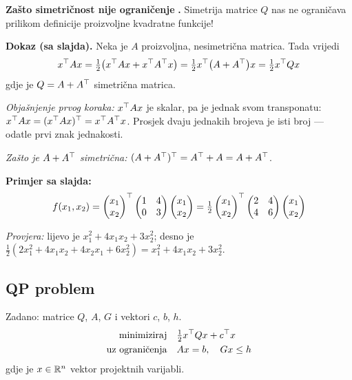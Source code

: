 \textbf{Zašto simetričnost nije ograničenje} \textbf{.} Simetrija
matrice $Q$ nas ne ograničava prilikom definicije proizvoljne kvadratne
funkcije!

\textbf{Dokaz (sa slajda).} Neka je $A$ proizvoljna, nesimetrična matrica. Tada
vrijedi
\[
x\T Ax = \tfrac12\big(x\T Ax + x\T A\T x\big)
       = \tfrac12 x\T\big(A + A\T\big)x
       = \tfrac12 x\T Qx
\]
gdje je $Q = A + A\T$ simetrična matrica.

\emph{Objašnjenje prvog koraka:} $x\T Ax$ je skalar, pa je jednak svom
transponatu: $x\T Ax = (x\T Ax)\T = x\T A\T x$. Prosjek dvaju jednakih brojeva
je isti broj --- odatle prvi znak jednakosti. \checkmark

\emph{Zašto je $A + A\T$ simetrična:} $(A + A\T)\T = A\T + A = A + A\T$.
\checkmark

\textbf{Primjer sa slajda:}
\[
f(x_1,x_2) = \begin{pmatrix}x_1\\x_2\end{pmatrix}\T
\begin{pmatrix}1&4\\0&3\end{pmatrix}
\begin{pmatrix}x_1\\x_2\end{pmatrix}
= \tfrac12\begin{pmatrix}x_1\\x_2\end{pmatrix}\T
\begin{pmatrix}2&4\\4&6\end{pmatrix}
\begin{pmatrix}x_1\\x_2\end{pmatrix}
\]

\emph{Provjera:} lijevo je $x_1^2 + 4x_1x_2 + 3x_2^2$; desno je
$\tfrac12(2x_1^2 + 4x_1x_2 + 4x_2x_1 + 6x_2^2) = x_1^2 + 4x_1x_2 + 3x_2^2$.
\checkmark

\subsection{QP problem}

\begin{definicija}[QP problem]
Zadano: matrice $Q$, $A$, $G$ i vektori $c$, $b$, $h$.
\begin{equation}
\label{eq:qp}
\begin{aligned}
\minim & \tfrac12 x\T Qx + c\T x \\
\uzogr & Ax = b, \quad Gx \le h
\end{aligned}
\end{equation}
gdje je $x \in \R^n$ vektor projektnih varijabli.
\end{definicija}

